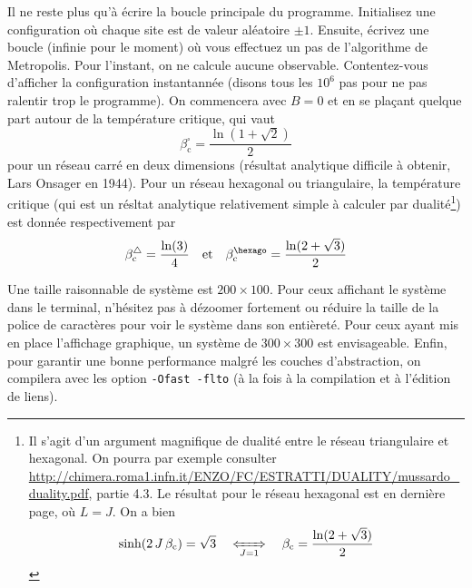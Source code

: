 \documentclass{book}
\newcommand{\inline}[1]{\texttt{#1}}
\begin{document}
Il ne reste plus qu'à écrire la boucle principale du programme. Initialisez une configuration où chaque site est de valeur aléatoire $\pm 1$. Ensuite, écrivez une boucle (infinie pour le moment) où vous effectuez un pas de l'algorithme de Metropolis. Pour l'instant, on ne calcule aucune observable. Contentez-vous d'afficher la configuration instantannée (disons tous les $10^6$ pas pour ne pas ralentir trop le programme). On commencera avec $B=0$ et en se plaçant quelque part autour de la température critique, qui vaut
\begin{equation}
\beta_\text{c}^\square = \frac{\ln(1+\sqrt{2})}{2}
\end{equation}
pour un réseau carré en deux dimensions (résultat analytique difficile à obtenir, Lars Onsager en 1944). Pour un réseau hexagonal ou triangulaire, la température critique (qui est un résltat analytique relativement simple à calculer par dualité\footnote{Il s'agit d'un argument magnifique de dualité entre le réseau triangulaire et hexagonal. On pourra par exemple consulter \url{http://chimera.roma1.infn.it/ENZO/FC/ESTRATTI/DUALITY/mussardo_duality.pdf}, partie 4.3. Le résultat pour le réseau hexagonal est en dernière page, où $L=J$. On a bien
\begin{equation}
\sinh(2\,J\,\beta_\text{c})=\sqrt{3} \quad \xLeftrightarrow[J=1]{} \quad \beta_\text{c} = \frac{\ln(2+\sqrt{3})}{2}
\end{equation}
}) est donnée respectivement par
\begin{equation}
\beta_\text{c}^\triangle = \frac{\ln(3)}{4} \quad\text{et}\quad \beta_\text{c}^{\hexago} = \frac{\ln(2+\sqrt{3})}{2}
\end{equation}

Une taille raisonnable de système est $200 \times 100$. Pour ceux affichant le système dans le terminal, n'hésitez pas à dézoomer fortement ou réduire la taille de la police de caractères pour voir le système dans son entièreté. Pour ceux ayant mis en place l'affichage graphique, un système de $300 \times 300$ est envisageable. Enfin, pour garantir une bonne performance malgré les couches d'abstraction, on compilera avec les option \inline{-Ofast -flto} (à la fois à la compilation et à l'édition de liens).\\
\end{document}
